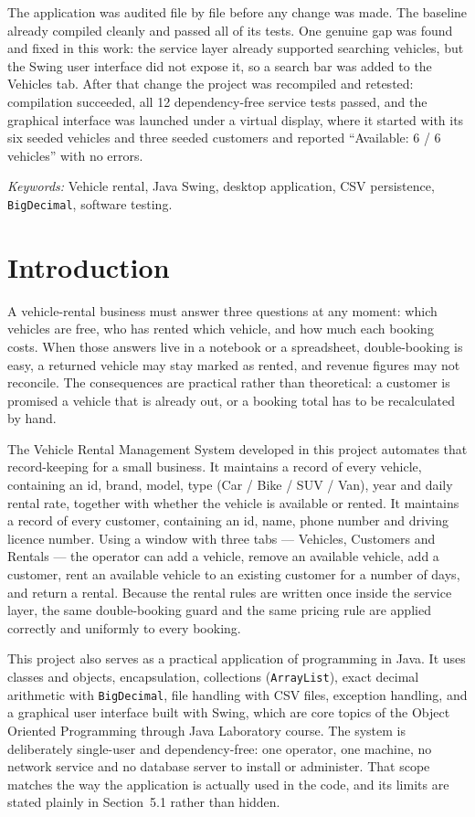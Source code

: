 \documentclass[11pt,a4paper]{article}
\begin{document}
The application was audited file by file before any change was made.
The baseline already compiled cleanly and passed all of its tests.
One genuine gap was found and fixed in this work: the service layer
already supported searching vehicles, but the Swing user interface did
not expose it, so a search bar was added to the Vehicles tab. After
that change the project was recompiled and retested: compilation
succeeded, all 12 dependency-free service tests passed, and the
graphical interface was launched under a virtual display, where it
started with its six seeded vehicles and three seeded customers and
reported ``Available: 6 / 6 vehicles'' with no errors.

\textit{Keywords:} Vehicle rental, Java Swing, desktop application,
CSV persistence, \texttt{BigDecimal}, software testing.

\section{Introduction}

A vehicle-rental business must answer three questions at any moment:
which vehicles are free, who has rented which vehicle, and how much
each booking costs. When those answers live in a notebook or a
spreadsheet, double-booking is easy, a returned vehicle may stay
marked as rented, and revenue figures may not reconcile. The
consequences are practical rather than theoretical: a customer is
promised a vehicle that is already out, or a booking total has to be
recalculated by hand.

The Vehicle Rental Management System developed in this project
automates that record-keeping for a small business. It maintains a
record of every vehicle, containing an id, brand, model, type
(Car / Bike / SUV / Van), year and daily rental rate, together with
whether the vehicle is available or rented. It maintains a record of
every customer, containing an id, name, phone number and driving
licence number. Using a window with three tabs --- Vehicles,
Customers and Rentals --- the operator can add a vehicle, remove an
available vehicle, add a customer, rent an available vehicle to an
existing customer for a number of days, and return a rental. Because
the rental rules are written once inside the service layer, the same
double-booking guard and the same pricing rule are applied correctly
and uniformly to every booking.

This project also serves as a practical application of programming in
Java. It uses classes and objects, encapsulation, collections
(\texttt{ArrayList}), exact decimal arithmetic with
\texttt{BigDecimal}, file handling with CSV files, exception handling,
and a graphical user interface built with Swing, which are core
topics of the Object Oriented Programming through Java Laboratory
course. The system is deliberately
single-user and dependency-free: one operator, one machine, no
network service and no database server to install or administer.
That scope matches the way the application is actually used in the
code, and its limits are stated plainly in Section~5.1 rather than
hidden.
\end{document}
